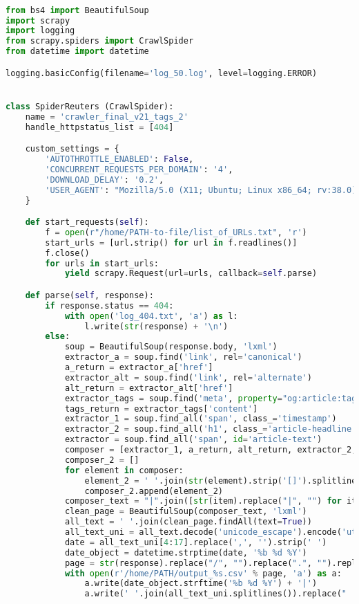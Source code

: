 \documentclass[12pt]{article}
\begin{document}
\begin{lstlisting}[language=Python]

from bs4 import BeautifulSoup
import scrapy
import logging
from scrapy.spiders import CrawlSpider
from datetime import datetime

logging.basicConfig(filename='log_50.log', level=logging.ERROR)


class SpiderReuters (CrawlSpider):
    name = 'crawler_final_v21_tags_2'
    handle_httpstatus_list = [404]

    custom_settings = {
        'AUTOTHROTTLE_ENABLED': False,
        'CONCURRENT_REQUESTS_PER_DOMAIN': '4',
        'DOWNLOAD_DELAY': '0.2',
        'USER_AGENT': "Mozilla/5.0 (X11; Ubuntu; Linux x86_64; rv:38.0) Gecko/20100101 Firefox/38.0"
    }

    def start_requests(self):
        f = open(r"/home/PATH-to-file/list_of_URLs.txt", 'r')
        start_urls = [url.strip() for url in f.readlines()]
        f.close()
        for urls in start_urls:
            yield scrapy.Request(url=urls, callback=self.parse)

    def parse(self, response):
        if response.status == 404:
            with open('log_404.txt', 'a') as l:
                l.write(str(response) + '\n')
        else:
            soup = BeautifulSoup(response.body, 'lxml')
            extractor_a = soup.find('link', rel='canonical')
            a_return = extractor_a['href']
            extractor_alt = soup.find('link', rel='alternate')
            alt_return = extractor_alt['href']
            extractor_tags = soup.find('meta', property="og:article:tag")
            tags_return = extractor_tags['content']
            extractor_1 = soup.find_all('span', class_='timestamp')
            extractor_2 = soup.find_all('h1', class_='article-headline')
            extractor = soup.find_all('span', id='article-text')
            composer = [extractor_1, a_return, alt_return, extractor_2, extractor, tags_return]
            composer_2 = []
            for element in composer:
                element_2 = ' '.join(str(element).strip('[]').splitlines())
                composer_2.append(element_2)
            composer_text = "|".join([str(item).replace("|", "") for item in composer_2])
            clean_page = BeautifulSoup(composer_text, 'lxml')
            all_text = ' '.join(clean_page.findAll(text=True))
            all_text_uni = all_text.decode('unicode_escape').encode('utf-8', 'strict')
            date = all_text_uni[4:17].replace(',', '').strip(' ')
            date_object = datetime.strptime(date, '%b %d %Y')
            page = str(response).replace("/", "").replace(".", "").replace(":", "").replace("<", "").replace(">", "")
            with open(r'/home/PATH/output_%s.csv' % page, 'a') as a:
                a.write(date_object.strftime('%b %d %Y') + '|')
                a.write(' '.join(all_text_uni.splitlines()).replace("  ", " "))

\end{lstlisting}
\end{document}
